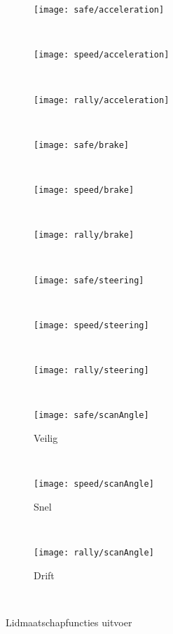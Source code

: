 \begin{figure}[h]
\centering
  \begin{subfigure}[b]{0.32\textwidth}
    \texttt{[image: safe/acceleration]}
  \end{subfigure}%
  ~
  \begin{subfigure}[b]{0.32\textwidth}
    \texttt{[image: speed/acceleration]}
  \end{subfigure}%
   ~
  \begin{subfigure}[b]{0.32\textwidth}
    \texttt{[image: rally/acceleration]}
  \end{subfigure}\\
  \begin{subfigure}[b]{0.32\textwidth}
    \texttt{[image: safe/brake]}
  \end{subfigure}%
  ~
  \begin{subfigure}[b]{0.32\textwidth}
    \texttt{[image: speed/brake]}
  \end{subfigure}%
   ~
  \begin{subfigure}[b]{0.32\textwidth}
    \texttt{[image: rally/brake]}
  \end{subfigure}\\
  \begin{subfigure}[b]{0.32\textwidth}
    \texttt{[image: safe/steering]}
  \end{subfigure}%
  ~
  \begin{subfigure}[b]{0.32\textwidth}
    \texttt{[image: speed/steering]}
  \end{subfigure}%
   ~
  \begin{subfigure}[b]{0.32\textwidth}
    \texttt{[image: rally/steering]}
  \end{subfigure}\\
  \begin{subfigure}[b]{0.32\textwidth}
    \texttt{[image: safe/scanAngle]}
    \caption{Veilig}
    \label{fig:safe_out}
  \end{subfigure}%
  ~
  \begin{subfigure}[b]{0.32\textwidth}
    \texttt{[image: speed/scanAngle]}
    \caption{Snel}
    \label{fig:speed_out}
  \end{subfigure}%
   ~
  \begin{subfigure}[b]{0.32\textwidth}
    \texttt{[image: rally/scanAngle]}
    \caption{Drift}
    \label{fig:drift_out}
  \end{subfigure}\\
\caption{Lidmaatschapfuncties uitvoer}\label{fig:lidfties_out}
\end{figure}